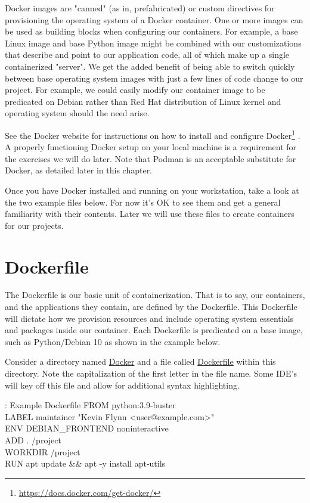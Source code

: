\justify
Docker images are "canned" (as in, prefabricated) or custom directives
for provisioning the operating system of a Docker container. One or more
images can be used as building blocks when configuring our containers.
For example, a base Linux image and base Python image might be combined
with our customizations that describe and point to our application code,
all of which make up a single containerized "server". We get the added
benefit of being able to switch quickly between base operating system
images with just a few lines of code change to our project. For example,
we could easily modify our container image to be predicated on Debian
rather than Red Hat distribution of Linux kernel and operating system
should the need arise.

\justify
See the Docker website for instructions on how to install and configure
Docker\footnote{\url{https://docs.docker.com/get-docker/}} . A properly
functioning Docker setup on your local machine is a requirement for the
exercises we will do later. Note that Podman is an acceptable substitute
for Docker, as detailed later in this chapter.

\justify
Once you have Docker installed and running on your workstation, take a
look at the two example files below. For now it's OK to see them and get
a general familiarity with their contents. Later we will use these files
to create containers for our projects.

\section{Dockerfile}
\justify
The Dockerfile is our basic unit of containerization. That is to say,
our containers, and the applications they contain, are defined by the
Dockerfile. This Dockerfile will dictate how we provision resources and
include operating system essentials and packages inside our container.
Each Dockerfile is predicated on a base image, such as Python/Debian 10
as shown in the example below.

\justify
Consider a directory named
\href{https://github.com/hotpeppersec/rapid_secdev_framework/tree/master/docker}{Docker}
and a file called
\href{https://github.com/hotpeppersec/rapid_secdev_framework/blob/master/docker/Dockerfile}{Dockerfile}
within this directory. Note the capitalization of the first letter in the file name. Some IDE's will key off this file and allow for additional syntax highlighting.

\begin{mybox}{\thetcbcounter: Example Dockerfile}
FROM python:3.9-buster\\
LABEL maintainer "Kevin Flynn <user@example.com>"\\

ENV DEBIAN\_FRONTEND noninteractive\\

ADD . /project\\
WORKDIR /project\\

RUN apt update \&\& apt -y install apt-utils\\
\end{mybox}

